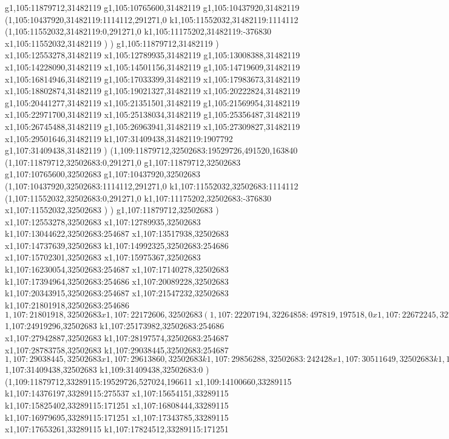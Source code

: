 {g1,105:11879712,31482119
g1,105:10765600,31482119
g1,105:10437920,31482119
(1,105:10437920,31482119:1114112,291271,0
k1,105:11552032,31482119:1114112
(1,105:11552032,31482119:0,291271,0
k1,105:11175202,31482119:-376830
x1,105:11552032,31482119
)
)
g1,105:11879712,31482119
)
x1,105:12553278,31482119
x1,105:12789935,31482119
g1,105:13008388,31482119
x1,105:14228090,31482119
x1,105:14501156,31482119
g1,105:14719609,31482119
x1,105:16814946,31482119
g1,105:17033399,31482119
x1,105:17983673,31482119
x1,105:18802874,31482119
g1,105:19021327,31482119
x1,105:20222824,31482119
g1,105:20441277,31482119
x1,105:21351501,31482119
g1,105:21569954,31482119
x1,105:22971700,31482119
x1,105:25138034,31482119
g1,105:25356487,31482119
x1,105:26745488,31482119
g1,105:26963941,31482119
x1,105:27309827,31482119
x1,105:29501646,31482119
k1,107:31409438,31482119:1907792
g1,107:31409438,31482119
)
(1,109:11879712,32502683:19529726,491520,163840
(1,107:11879712,32502683:0,291271,0
g1,107:11879712,32502683
g1,107:10765600,32502683
g1,107:10437920,32502683
(1,107:10437920,32502683:1114112,291271,0
k1,107:11552032,32502683:1114112
(1,107:11552032,32502683:0,291271,0
k1,107:11175202,32502683:-376830
x1,107:11552032,32502683
)
)
g1,107:11879712,32502683
)
x1,107:12553278,32502683
x1,107:12789935,32502683
k1,107:13044622,32502683:254687
x1,107:13517938,32502683
x1,107:14737639,32502683
k1,107:14992325,32502683:254686
x1,107:15702301,32502683
x1,107:15975367,32502683
k1,107:16230054,32502683:254687
x1,107:17140278,32502683
k1,107:17394964,32502683:254686
x1,107:20089228,32502683
k1,107:20343915,32502683:254687
x1,107:21547232,32502683
k1,107:21801918,32502683:254686
$1,107:21801918,32502683
x1,107:22172606,32502683
(1,107:22207194,32264858:497819,197518,0
x1,107:22672245,32264858
)
x1,107:23451397,32502683
k1,107:23693826,32502683:242429
x1,107:24349187,32502683
k1,107:24591615,32502683:242428
x1,107:24919296,32502683
$1,107:24919296,32502683
k1,107:25173982,32502683:254686
x1,107:27942887,32502683
k1,107:28197574,32502683:254687
x1,107:28783758,32502683
k1,107:29038445,32502683:254687
$1,107:29038445,32502683
x1,107:29613860,32502683
k1,107:29856288,32502683:242428
x1,107:30511649,32502683
k1,107:30754077,32502683:242428
x1,107:31409438,32502683
$1,107:31409438,32502683
k1,109:31409438,32502683:0
)
(1,109:11879712,33289115:19529726,527024,196611
x1,109:14100660,33289115
k1,107:14376197,33289115:275537
x1,107:15654151,33289115
k1,107:15825402,33289115:171251
x1,107:16808444,33289115
k1,107:16979695,33289115:171251
x1,107:17343785,33289115
x1,107:17653261,33289115
k1,107:17824512,33289115:171251
}
